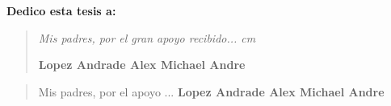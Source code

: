 
\newpage
 \pagestyle{plain}
 
 {\bf\Large {Dedico esta tesis a:}}
 \vskip 1cm
\begin{quotation}
{\it Mis padres, por el gran apoyo recibido...
 cm

\vskip 1cm
\textbf{Lopez Andrade Alex Michael Andre }}
\end{quotation}
\newpage

\newpage

 {\bf\Large {}}
 \vskip 1.5cm
 {\bf\Large {}}
\begin{quotation}
Mis padres, por el apoyo ...
\vskip 1cm
\textbf{Lopez Andrade Alex Michael Andre }  %
 \end{quotation}
 




